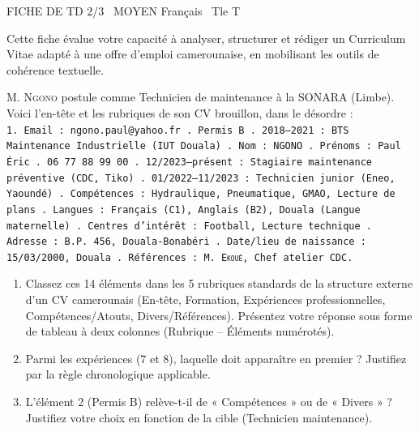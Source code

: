 \documentclass[11pt]{article}
\begin{document}
\begin{tcolorbox}[enhanced,colback=popink,colframe=popink,arc=10pt,boxrule=0pt,left=12pt,right=12pt,top=9pt,bottom=9pt]
{\color{white}\popxbold\small FICHE DE TD 2/3 \textbullet\ MOYEN \hfill Français \textbullet\ Tle T\par}
\end{tcolorbox}
\vspace{4pt}
\noindent Cette fiche évalue votre capacité à analyser, structurer et rédiger un Curriculum Vitae adapté à une offre d'emploi camerounaise, en mobilisant les outils de cohérence textuelle.

\begin{exercice}
M. \textsc{Ngono} postule comme Technicien de maintenance à la SONARA (Limbe). Voici l'en-tête et les rubriques de son CV brouillon, dans le désordre :\\
\texttt{1. Email : ngono.paul@yahoo.fr . Permis B . 2018--2021 : BTS Maintenance Industrielle (IUT Douala) . Nom : NGONO . Prénoms : Paul Éric . 06 77 88 99 00 . 12/2023--présent : Stagiaire maintenance préventive (CDC, Tiko) . 01/2022--11/2023 : Technicien junior (Eneo, Yaoundé) . Compétences : Hydraulique, Pneumatique, GMAO, Lecture de plans . Langues : Français (C1), Anglais (B2), Douala (Langue maternelle) . Centres d'intérêt : Football, Lecture technique . Adresse : B.P. 456, Douala-Bonabéri . Date/lieu de naissance : 15/03/2000, Douala . Références : M. \textsc{Ekoué}, Chef atelier CDC.}
\begin{enumerate}
    \item Classez ces 14 éléments dans les 5 rubriques standards de la structure externe d'un CV camerounais (En-tête, Formation, Expériences professionnelles, Compétences/Atouts, Divers/Références). Présentez votre réponse sous forme de tableau à deux colonnes (Rubrique -- Éléments numérotés).
    \item Parmi les expériences (7 et 8), laquelle doit apparaître en premier ? Justifiez par la règle chronologique applicable.
    \item L'élément 2 (Permis B) relève-t-il de « Compétences » ou de « Divers » ? Justifiez votre choix en fonction de la cible (Technicien maintenance).
\end{enumerate}
\end{exercice}
\end{document}
